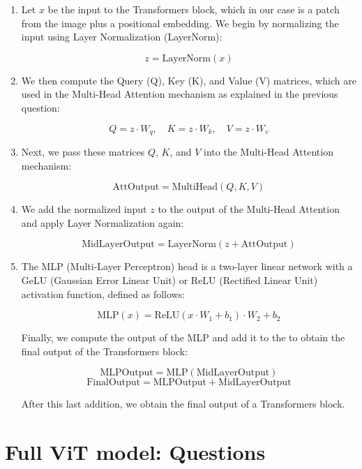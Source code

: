 \begin{enumerate}
    \item Let \( x \) be the input to the Transformers block, which in our case is a patch from the image plus a positional embedding. We begin by normalizing the input using Layer Normalization (LayerNorm):

        \[
            z = \text{LayerNorm}(x)
        \]

    \item We then compute the Query (Q), Key (K), and Value (V) matrices, which are used in the Multi-Head Attention mechanism as explained in the previous question:

        \[
            Q = z \cdot W_q, \quad K = z \cdot W_k, \quad V = z \cdot W_v
        \]

    \item Next, we pass these matrices \( Q \), \( K \), and \( V \) into the Multi-Head Attention mechanism:

        \[
            \text{AttOutput} = \text{MultiHead}(Q, K, V)
        \]

    \item We add the normalized input \( z \) to the output of the Multi-Head Attention and apply Layer Normalization again:

        \[
            \text{MidLayerOutput} = \text{LayerNorm}(z + \text{AttOutput})
        \]

    \item The MLP (Multi-Layer Perceptron) head is a two-layer linear network with a GeLU (Gaussian Error Linear Unit) or ReLU (Rectified Linear Unit) activation function, defined as follows:

        \[
            \text{MLP}(x) = \text{ReLU}(x \cdot W_1 + b_1) \cdot W_2 + b_2
        \]

    Finally, we compute the output of the MLP and add it to the  to obtain the final output of the Transformers block:

        \[
            \text{MLPOutput} = \text{MLP}(\text{MidLayerOutput})
        \]
        \[
            \text{FinalOutput} = \text{MLPOutput} + \text{MidLayerOutput}
        \]

    After this last addition, we obtain the final output of a Transformers block.
\end{enumerate}

\section{Full ViT model: Questions}

